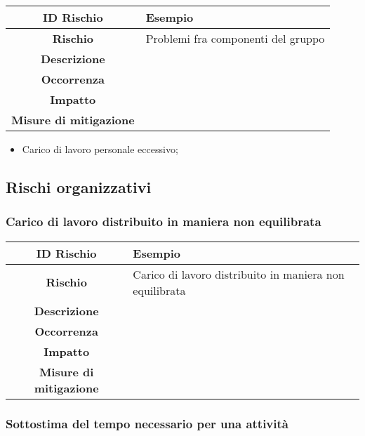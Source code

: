 \documentclass[10pt, a4paper]{article}
\begin{document}
{{\renewcommand{\arraystretch}{1.5}
\begin{tabularx}{\textwidth}{c|X}
\textbf{ID Rischio} & Esempio \\
\hline
\textbf{Rischio} & Problemi fra componenti del gruppo  \\
\hline
\textbf{Descrizione} & \\
\hline
\textbf{Occorrenza} & \\
\hline
\textbf{Impatto} & \\
\hline
\textbf{Misure di mitigazione} & \\
\end{tabularx}

\begin{itemize}
    \item Carico di lavoro personale eccessivo;\\ 
     
\end{itemize}


\subsection{Rischi organizzativi}

\subsubsection{Carico di lavoro distribuito in maniera non equilibrata}

{\renewcommand{\arraystretch}{1.5}
\begin{tabularx}{\textwidth}{c|X}
\textbf{ID Rischio} & Esempio \\
\hline
\textbf{Rischio} & Carico di lavoro distribuito in maniera non equilibrata \\
\hline
\textbf{Descrizione} & \\
\hline
\textbf{Occorrenza} & \\
\hline
\textbf{Impatto} & \\
\hline
\textbf{Misure di mitigazione} & \\

\end{tabularx}


\subsubsection{Sottostima del tempo necessario per una attività}

}}}
\end{document}
